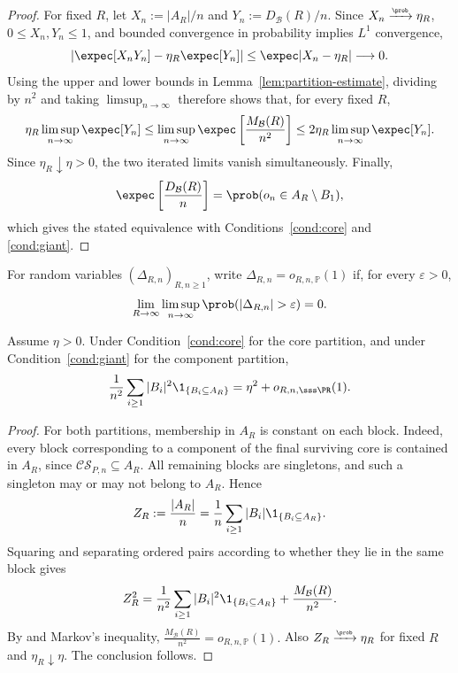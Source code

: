 \documentclass[11pt]{article}
\theoremstyle{plain}
\begin{document}
\begin{proof}
For fixed $R$, let $X_n:=|A_R|/n$ and $Y_n:=D_{\mathcal B}(R)/n$. Since
$X_n\xrightarrow{\scriptscriptstyle\prob}\eta_R$, $0\le X_n,Y_n\le1$, and
bounded convergence in probability implies $L^1$ convergence,
\[
\left|\expec[X_nY_n]-\eta_R\expec[Y_n]\right|
\le\expec|X_n-\eta_R|\longrightarrow0.
\] 
Using the upper and lower bounds in Lemma~\ref{lem:partition-estimate}, dividing by $n^2$ and taking $\limsup_{n\to\infty}$
therefore shows that, for every fixed $R$,
\[
\eta_R\limsup_{n\to\infty}\expec[Y_n]
\le
\limsup_{n\to\infty}\expec\left[\frac{M_{\mathcal B}(R)}{n^2}\right]
\le
2\eta_R\limsup_{n\to\infty}\expec[Y_n].
\]
Since $\eta_R\downarrow\eta>0$, the two
iterated limits vanish simultaneously. Finally,
\[
\expec\left[\frac{D_{\mathcal B}(R)}n\right]
=\prob(o_n\in A_R\setminus B_1),
\]
which gives the stated equivalence with Conditions~\ref{cond:core} and
\ref{cond:giant}.
\end{proof}
For random variables $(\Delta_{R,n})_{R,n\ge1}$, write
$\Delta_{R,n}=o_{R,n,\mathbb P}(1)$ if, for every $\varepsilon>0$,
\[
\lim_{R\to\infty}\limsup_{n\to\infty}
\prob(|\Delta_{R,n}|>\varepsilon)=0.
\]


\begin{lemma}\label{lem:sum-squares}
Assume $\eta>0$. Under Condition~\ref{cond:core} for the core partition, and under Condition~\ref{cond:giant} for the component partition,
\[
\frac1{n^2}\sum_{i\ge1}|B_i|^2\1_{\{B_i\subseteq A_R\}}
=
\eta^2+o_{R,n,{\sss \PR}}(1).
\]
\end{lemma}

\begin{proof}
For both partitions, membership in $A_R$ is constant on each block.
Indeed, every block corresponding to a component of the final surviving
core is contained in $A_R$, since $\mathcal{CS}_{P,n}\subseteq A_R$.
All remaining blocks are singletons, and such a singleton may or may not
belong to $A_R$.
Hence
\[
Z_R:=\frac{|A_R|}{n}
=\frac1n\sum_{i\ge1}|B_i|\1_{\{B_i\subseteq A_R\}}.
\]
Squaring and separating ordered pairs according to whether they lie in the same
block gives
\[
Z_R^2
=\frac1{n^2}\sum_{i\ge1}|B_i|^2\1_{\{B_i\subseteq A_R\}}
+\frac{M_{\mathcal B}(R)}{n^2}.
\]
By  and Markov's inequality,
\(
\frac{M_{\mathcal B}(R)}{n^2}=o_{R,n,\mathbb P}(1).
\)
Also $Z_R\xrightarrow{\scriptscriptstyle\prob}\eta_R$ for fixed $R$ and
$\eta_R\downarrow\eta$. The conclusion follows.
\end{proof}
    
\end{document}
